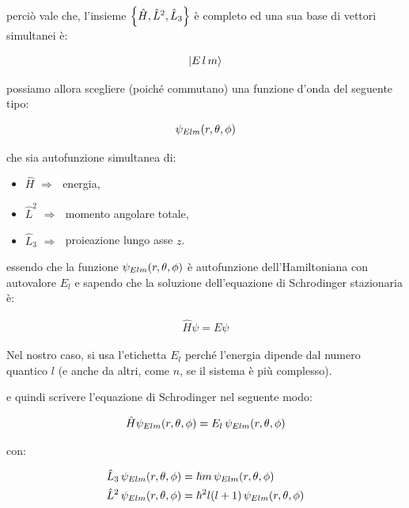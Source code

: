 	perciò vale che, l'insieme $\qty{\hat{H}, \hat{L}^2, \hat{L}_3}$ è completo ed una sua base di vettori simultanei è:
	
\begin{align*}
	\ket{E \, l \, m}
\end{align*}

	possiamo allora scegliere (poiché commutano) una funzione d'onda del seguente tipo:
	
\begin{align*}
	\psi_{Elm}\qty(r, \theta, \phi)
\end{align*}

	che sia autofunzione simultanea di:
	
\begin{itemize}
	\item $\hat{H} \, \, \Rightarrow \, \, $ energia,
	\item $\hat{L}^2 \, \, \Rightarrow \, \, $ momento angolare totale,
	\item $\hat{L}_3 \, \, \Rightarrow \, \, $ proieazione lungo asse $z$.
\end{itemize}
	
	essendo che la funzione $\psi_{Elm}\qty(r, \theta, \phi)$ è autofunzione dell'Hamiltoniana con autovalore $E_l$ e sapendo che la soluzione dell'equazione di Schrodinger stazionaria è:

\begin{align*}
	\hat{H}\psi = E \psi
\end{align*}

\begin{myapprf}
	Nel nostro caso, si usa l’etichetta $E_l$ perché l'energia dipende dal numero quantico $l$ (e anche da altri, come $n$, se il sistema è più complesso).
\end{myapprf}

	e quindi scrivere l'equazione di Schrodinger nel seguente modo:
	
\begin{align*}
	\hat{H} \psi_{Elm}\qty(r, \theta, \phi) = E_{l} \, \psi_{Elm}\qty(r, \theta, \phi)
\end{align*}

	con:
	
\begin{align*}
	& \hat{L}_3 \, \psi_{Elm}\qty(r, \theta, \phi) = \hbar m \, \psi_{Elm}\qty(r, \theta, \phi) \\
	& \hat{L}^2 \, \psi_{Elm}\qty(r, \theta, \phi) = \hbar^2 l\qty(l +1) \, \psi_{Elm} \qty(r, \theta, \phi)
\end{align*}

